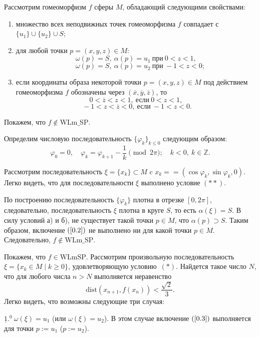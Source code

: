 \documentclass[12pt]{article}
\begin{document}
 Рассмотрим гомеоморфизм $f$ сферы $M$, обладающий следующими свойс\-твами:
 \begin{enumerate}
 \item[а)] множество всех неподвижных точек гомеоморфизма $f$ совпадает с $\{u_1\}\cup\{u_2\}\cup S$;
 \item[б)] для любой точки $p=(x,y,z)\in M$:
 $$\omega(p)=S,\ \alpha(p)=u_1\ \textrm{при}\ 0<z<1,$$
 $$\quad\ \omega(p)=S,\ \alpha(p)=u_2\ \textrm{при}\ -1<z<0;$$
 \item[в)] если координаты образа некоторой точки $p\!=\!(x,y,z)\!\in\! M$ под дейс\-твием гомеоморфизма $f$ обозначены через $(\overline x, \overline y,\overline z)$, то
 $$0<\overline{z}<z<1,\ \textrm{если}\ 0<z<1,$$
 $$\ -1<z<\overline{z}<0,\ \textrm{если}\ -1<z<0.$$
 \end{enumerate}
 
 Покажем, что $f\!\notin\!\textrm{WLm\_SP}$.
 
 Определим числовую последовательность $\{\varphi_k\}_{k\leq0}$ следующим образом:
 $$\varphi_0=0,\quad\varphi_k=\varphi_{k+1}-\frac{1}{k}\pmod{2\pi};\quad k<0,\ k\in\mathbb{Z}.$$
 
 Рассмотрим последовательность $\xi=\{x_k\}\subset M$ c $x_k=\allowbreak=(\cos{\varphi_k},\sin{\varphi_k},0)$. Легко видеть, что для последовательности $\xi$ выполнено условие $(**)$.
 
 По построению последовательность $\{\varphi_k\}$ плотна в отрезке $[0,2\pi]$, следовательно, последовательность $\xi$ плотна в круге $S$, то есть $\alpha(\xi)=S$. В силу условий а) и б), не существует такой точки $p\in M$, что $\alpha(p)\supset S$. Таким образом, включение $(\ref{0.2})$ не выполнено ни для какой точки $p\in M$. Следовательно, $f\!\notin\!\textrm{WLm\_SP}$.
 
 Покажем, что $f\!\in\!\textrm{WLmSP}$. Рассмотрим произвольную последовательность $\xi=\{x_k\!\in\! M\mid k\geq 0\}$, удовлетворяющую условию~$(*)$. Найдется такое число $N$, что для любого числа $n>N$ выполняется неравенство 
\begin{equation}
\label{4.1} 
\mbox{dist}\left(x_{n+1},f(x_n)\right)<\frac{\sqrt{2}}{3}.
\end{equation}
 Легко видеть, что возможны следующие три случая:
 
 $\underline{1}.^\textrm{0}\ \omega(\xi)=u_1$ (или $\omega(\xi)=u_2$). В этом случае включение $(\ref{0.3})$ выполняется для точки $p:=u_1$ ($p:=u_2$).
 
\end{document}
